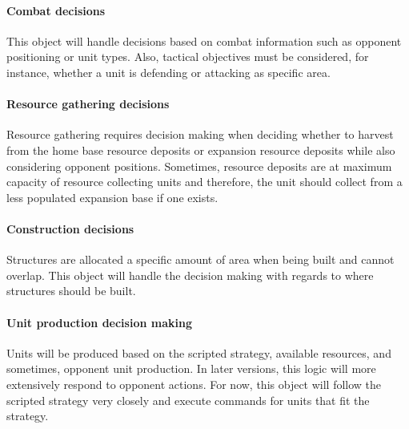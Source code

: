 \documentclass[10pt,letterpaper,onecolumn,draftclsnofoot]{IEEEtran}
\begin{document}
\paragraph{Combat decisions}
This object will handle decisions based on combat information such as opponent positioning or unit types. Also, tactical objectives must be considered, for instance, whether a unit is defending or attacking as specific area.

\paragraph{Resource gathering decisions}
Resource gathering requires decision making when deciding whether to harvest from the home base resource deposits or expansion resource deposits while also considering opponent positions. Sometimes, resource deposits are at maximum capacity of resource collecting units and therefore, the unit should collect from a less populated expansion base if one exists.

\paragraph{Construction decisions}
Structures are allocated a specific amount of area when being built and cannot overlap. This object will handle the decision making with regards to where structures should be built. 

\paragraph{Unit production decision making}
Units will be produced based on the scripted strategy, available resources, and sometimes, opponent unit production. In later versions, this logic will more extensively respond to opponent actions. For now, this object will follow the scripted strategy very closely and execute commands for units that fit the strategy.
\end{document}
